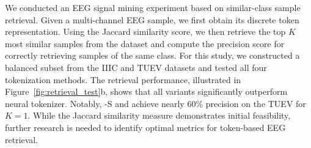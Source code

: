 





 We conducted an EEG signal mining experiment based on similar-class sample retrieval. Given a multi-channel EEG sample, we first obtain its discrete token representation. Using the Jaccard similarity score, we then retrieve the top $K$ most similar samples from the dataset and compute the precision score for correctly retrieving samples of the same class. For this study, we constructed a balanced subset from the IIIC and TUEV datasets and tested all four tokenization methods. The retrieval performance, illustrated in Figure~\ref{fig:retrieval_test}b, shows that all \tokenizer variants significantly outperform neural tokenizer. Notably, \tokenizer-S and \tokenizer achieve nearly $60\%$ precision on the TUEV for $K=1$. While the Jaccard similarity measure demonstrates initial feasibility, further research is needed to identify optimal metrics for token-based EEG retrieval. 


